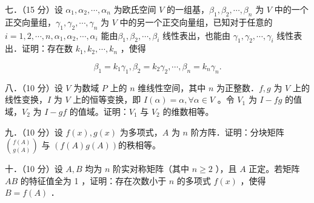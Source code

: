 \documentclass{article}
\begin{document}
七．（15 分）设 \(\alpha_{1}, \alpha_{2}, \cdots, \alpha_{n}\) 为欧氏空间 \(V\) 的一组基，\(\beta_{1}, \beta_{2}, \cdots, \beta_{n}\) 为 \(V\) 中的一个正交向量组，\(\gamma_{1}, \gamma_{2}, \cdots, \gamma_{n}\) 为 \(V\) 中的另一个正交向量组，已知对于任意的 \(i=1,2, \cdots, n, \alpha_{1}, \alpha_{2}, \cdots, \alpha_{i}\) 能由\(\beta_{1}, \beta_{2}, \cdots, \beta_{i}\) 线性表出，也能由 \(\gamma_{1}, \gamma_{2}, \cdots, \gamma_{i}\) 线性表出．证明：存在数 \(k_{1}, k_{2}, \cdots, k_{n}\) ，使得

\[
\beta_{1}=k_{1} \gamma_{1}, \beta_{2}=k_{2} \gamma_{2}, \cdots, \beta_{n}=k_{n} \gamma_{n} .
\]

八．（10 分）设 \(V\) 为数域 \(P\) 上的 \(n\) 维线性空间，其中 \(n\) 为正整数．\(f, g\) 为 \(V\) 上的线性变换，\(I\) 为 \(V\) 上的恒等变换，即 \(I(\alpha)=\alpha, \forall \alpha \in V\) 。令 \(V_{1}\) 为 \(I-f g\) 的值域，\(V_{2}\) 为 \(I-g f\) 的值域。证明：\(V_{1}\) 与 \(V_{2}\) 的维数相等。

九．（10 分）设 \(f(x), g(x)\) 为多项式，\(A\) 为 \(n\) 阶方阵．证明：分块矩阵 \(\binom{f(A)}{g(A)}\) 与 \((f(A) g(A))\)的秩相等。

十．（10 分）设 \(A, B\) 均为 \(n\) 阶实对称矩阵（其中 \(n \geq 2\) ），且 \(A\) 正定。若矩阵 \(A B\) 的特征值全为 1 ，证明：存在次数小于 \(n\) 的多项式 \(f(x)\) ，使得 \(B=f(A)\) ．
\end{document}
